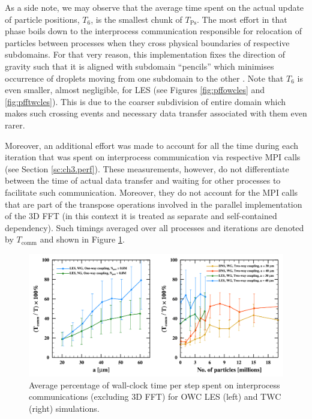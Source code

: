 \documentclass{pracamgren}
\begin{document}
As a side note, we may observe that the average time spent on the actual update of particle positions, $T_6$, is the smallest chunk of $T_{\text{Ps}}$.
The most effort in that phase boils down to the interprocess communication responsible for relocation of particles between processes when they cross physical boundaries of respective subdomains.
For that very reason, this implementation fixes the direction of gravity such that it is aligned with subdomain ``pencils'' which minimises occurrence of droplets moving from one subdomain to the other \parencite{Ayala2014}.
Note that $T_6$ is even smaller, almost negligible, for LES (see Figures \ref{fig:pffowcles} and \ref{fig:pfftwcles}).
This is due to the coarser subdivision of entire domain which makes such crossing events and necessary data transfer associated with them even rarer.

\medskip

Moreover, an additional effort was made to account for all the time during each iteration that was spent on interprocess communication via respective MPI calls (see Section \ref{sc:ch3.perf}).
These measurements, however, do not differentiate between the time of actual data transfer and waiting for other processes to facilitate such communication.
Moreover, they do not account for the MPI calls that are part of the transpose operations involved in the parallel implementation of the 3D FFT (in this context it is treated as separate and self-contained dependency).
Such timings averaged over all processes and iterations are denoted by $T_{\text{comm}}$ and shown in Figure \ref{fig:pffcomm}.

\begin{figure}[h]
\centering
\includegraphics[width=13.5cm]{figures/3-12_pffcomm.pdf}
\caption{
Average percentage of wall-clock time per step spent on interprocess communications (excluding 3D FFT) for OWC LES (left) and TWC (right) simulations.
}
\label{fig:pffcomm}
\end{figure}
\end{document}
